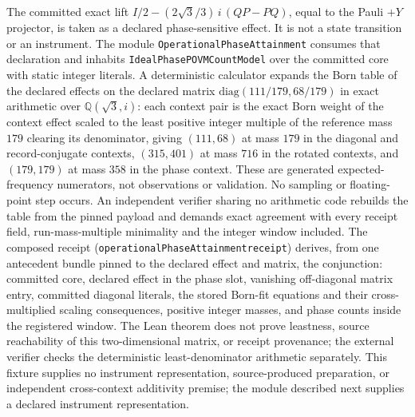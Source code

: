\documentclass[11pt]{article}
\renewcommand{\_}{\textunderscore\allowbreak}
\theoremstyle{remark}
\begin{document}
{\raggedright
The committed exact lift
$I/2 - (2\sqrt{3}/3)\,i\,(QP - PQ)$, equal to the Pauli $+Y$ projector, is taken
as a declared phase-sensitive effect. It is not a state transition or an
instrument. The module \texttt{OperationalPhaseAttainment} consumes that
declaration and inhabits \texttt{IdealPhasePOVMCountModel} over the committed
core with static integer literals. A deterministic calculator expands the
Born table of the declared effects on the declared matrix
$\mathrm{diag}(111/179, 68/179)$ in exact arithmetic over
$\mathbb{Q}(\sqrt{3}, i)$: each context pair is the exact Born weight of the
context effect scaled to the least positive integer multiple of the reference
mass $179$ clearing its denominator, giving
$(111, 68)$ at mass $179$ in the diagonal and record-conjugate contexts,
$(315, 401)$ at mass $716$ in the rotated contexts, and $(179, 179)$ at mass
$358$ in the phase context. These are generated expected-frequency
numerators, not observations or validation. No sampling or floating-point
step occurs. An independent verifier sharing no arithmetic code rebuilds the table
from the pinned payload and demands exact agreement with every receipt
field, run-mass-multiple minimality and the integer window included. The
composed receipt (\texttt{operationalPhaseAttainment\_receipt}) derives,
from one antecedent bundle pinned to the declared effect and matrix, the
conjunction: committed core, declared effect in the phase slot, vanishing
off-diagonal matrix entry, committed diagonal literals, the stored Born-fit
equations and their cross-multiplied scaling consequences, positive integer
masses, and phase counts inside the registered window. The Lean theorem does
not prove leastness, source reachability of this two-dimensional matrix, or
receipt provenance; the external verifier checks the deterministic
least-denominator arithmetic separately. This fixture supplies no instrument
representation, source-produced preparation, or independent cross-context
additivity premise; the module described next supplies a declared instrument
representation.\par}
\end{document}
